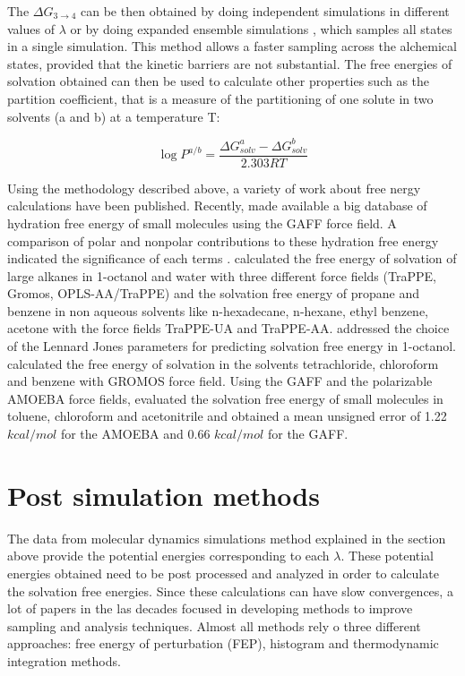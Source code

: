 The $\Delta G_{3 \rightarrow 4}$ can be then obtained by doing independent simulations in different values of $\lambda$ or by doing expanded ensemble simulations \cite{lyubartsev}, which samples all states in a single simulation. This method allows a faster sampling across the alchemical states, provided that the kinetic barriers are not substantial. The free energies of solvation obtained can then be used to calculate other properties such as the partition coefficient, that is a measure of the partitioning of one solute in two solvents (a and b) at a temperature T:

\begin{equation}
\label{eqn:partcoe}
\log{P}^{a/b} = \frac{\Delta G_{solv}^{a} - \Delta G_{solv}^{b}}{2.303RT}
\end{equation}

Using the methodology described above, a variety of work about free nergy calculations have been published. Recently,  made available a big database of hydration free energy of small molecules using the GAFF force field. A comparison of polar and nonpolar contributions to these hydration free energy indicated the significance of each terms  \cite{izairi2017}.  calculated the free energy of solvation of large alkanes in 1-octanol and water with three different force fields (TraPPE, Gromos, OPLS-AA/TraPPE) and the solvation free energy of propane and benzene in non aqueous solvents like n-hexadecane, n-hexane, ethyl benzene, acetone  with the force fields TraPPE-UA and TraPPE-AA.  addressed the choice of the Lennard Jones parameters for predicting solvation free energy in 1-octanol.  calculated the free energy of solvation in the solvents tetrachloride, chloroform and benzene with GROMOS force field. Using the GAFF and the polarizable AMOEBA force fields,  evaluated the solvation free energy of small molecules in toluene, chloroform and acetonitrile and obtained a mean unsigned error of 1.22 $kcal/mol$ for the AMOEBA and 0.66 $kcal/mol$ for the GAFF.

\section{Post simulation methods}

The data from molecular dynamics simulations method explained in the section above provide the potential energies corresponding to each $\lambda$. These potential energies obtained need to be post processed and analyzed in order to calculate the solvation free energies. Since these calculations  can have slow convergences, a lot of papers in the las decades focused in developing methods to improve sampling and analysis techniques. Almost all methods rely o three different approaches: free energy of perturbation (FEP), histogram and thermodynamic integration methods.
